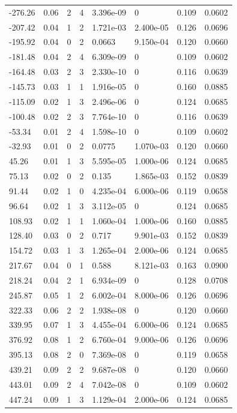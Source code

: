\documentclass[preview]{standalone}
\begin{document}
{{\begin{tabular}{L{1.2cm}C{1.2cm} C{0.3cm}C{0.5cm} C{1.4cm}C{1.4cm} C{1.4cm}C{1.4cm}}
  -276.26  &  0.06  & 2     &  4 &  3.396e-09  & 0  & 0.109 &  0.0602   \\ 
  -207.42  &  0.04  & 1     &  2 &  1.721e-03  & 2.400e-05  & 0.126 &  0.0696   \\ 
  -195.92  &  0.04  & 0     &  2 &  0.0663  & 9.150e-04  & 0.120 &  0.0660   \\ 
  -181.48  &  0.04  & 2     &  4 &  6.309e-09  & 0  & 0.109 &  0.0602   \\ 
  -164.48  &  0.03  & 2     &  3 &  2.330e-10  & 0  & 0.116 &  0.0639   \\ 
  -145.73  &  0.03  & 1     &  1 &  1.916e-05  & 0  & 0.160 &  0.0885   \\ 
  -115.09  &  0.02  & 1     &  3 &  2.496e-06  & 0  & 0.124 &  0.0685   \\ 
  -100.48  &  0.02  & 2     &  3 &  7.764e-10  & 0  & 0.116 &  0.0639   \\ 
  -53.34  &  0.01  & 2     &  4 &  1.598e-10  & 0  & 0.109 &  0.0602   \\ 
  -32.93  &  0.01  & 0     &  2 &  0.0775  & 1.070e-03  & 0.120 &  0.0660   \\ 
  45.26  &  0.01  & 1     &  3 &  5.595e-05  & 1.000e-06  & 0.124 &  0.0685   \\ 
  75.13  &  0.02  & 0     &  2 &  0.135  & 1.865e-03  & 0.152 &  0.0839   \\ 
  91.44  &  0.02  & 1     &  0 &  4.235e-04  & 6.000e-06  & 0.119 &  0.0658   \\ 
  96.64  &  0.02  & 1     &  3 &  3.112e-05  & 0  & 0.124 &  0.0685   \\ 
  108.93  &  0.02  & 1     &  1 &  1.060e-04  & 1.000e-06  & 0.160 &  0.0885   \\ 
  128.40  &  0.03  & 0     &  2 &  0.717  & 9.901e-03  & 0.152 &  0.0839   \\ 
  154.72  &  0.03  & 1     &  3 &  1.265e-04  & 2.000e-06  & 0.124 &  0.0685   \\ 
  217.67  &  0.04  & 0     &  1 &  0.588  & 8.121e-03  & 0.163 &  0.0900   \\ 
  218.24  &  0.04  & 2     &  1 &  6.934e-09  & 0  & 0.128 &  0.0708   \\ 
  245.87  &  0.05  & 1     &  2 &  6.002e-04  & 8.000e-06  & 0.126 &  0.0696   \\ 
  322.33  &  0.06  & 2     &  2 &  1.938e-08  & 0  & 0.120 &  0.0660   \\ 
  339.95  &  0.07  & 1     &  3 &  4.455e-04  & 6.000e-06  & 0.124 &  0.0685   \\ 
  376.92  &  0.08  & 1     &  2 &  6.760e-04  & 9.000e-06  & 0.126 &  0.0696   \\ 
  395.13  &  0.08  & 2     &  0 &  7.369e-08  & 0  & 0.119 &  0.0658   \\ 
  439.21  &  0.09  & 2     &  2 &  9.687e-08  & 0  & 0.120 &  0.0660   \\ 
  443.01  &  0.09  & 2     &  4 &  7.042e-08  & 0  & 0.109 &  0.0602   \\ 
  447.24  &  0.09  & 1     &  3 &  1.129e-04  & 2.000e-06  & 0.124 &  0.0685   \\ 
\hline 
\end{tabular} 

}}
\end{document}
